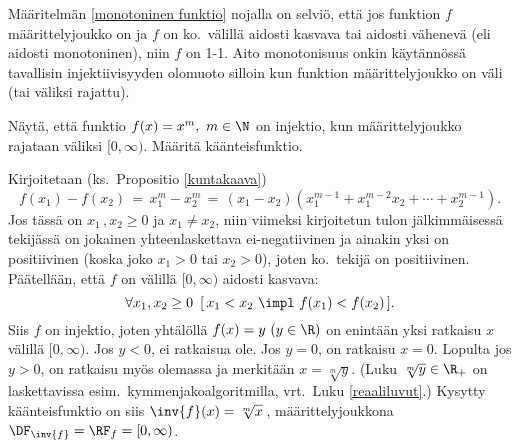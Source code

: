 Määritelmän \ref{monotoninen funktio} nojalla on selviö, että jos funktion $f$ 
määrittelyjoukko on  ja $f$ on ko.\ välillä aidosti kasvava tai aidosti vähenevä
(eli aidosti monotoninen), niin $f$ on 1-1. Aito monotonisuus onkin käytännössä tavallisin
injektiivisyyden olomuoto silloin kun funktion määrittelyjoukko on väli (tai väliksi rajattu).
\begin{Exa} \label{x^m:n käänteisfunktio} Näytä, että funktio $f(x)=x^m,\ m\in\N$ on injektio,
kun määrittelyjoukko rajataan väliksi $[0,\infty)$. Määritä käänteisfunktio.
\end{Exa}
\ratk Kirjoitetaan (ks.\ Propositio \ref{kuntakaava})
\[
f(x_1)-f(x_2) \,=\, x_1^m-x_2^m \,=\, (x_1-x_2)(x_1^{m-1}+x_1^{m-2}x_2+\cdots +x_2^{m-1}).
\]
Jos tässä on $x_1\,,x_2 \ge 0$ ja $x_1 \neq x_2$, niin viimeksi kirjoitetun tulon 
jälkimmäisessä tekijässä on jokainen yhteenlaskettava ei-negatiivinen ja ainakin yksi on
positiivinen (koska joko $x_1>0$ tai $x_2>0$), joten ko.\ tekijä on positiivinen. Päätellään,
että $f$ on välillä $[0,\infty)$ aidosti kasvava:
\[
\forall x_1,x_2 \ge 0\,\ [\,x_1<x_2\ \impl\ f(x_1)<f(x_2)\,].
\]
Siis $f$ on injektio, joten yhtälöllä $f(x)=y\ (y\in\R)$ on enintään yksi ratkaisu $x$
välillä $[0,\infty)$. Jos $y<0$, ei ratkaisua ole. Jos $y=0$, on ratkaisu $x=0$. Lopulta
jos $y>0$, on ratkaisu myös olemassa ja merkitään $x=\sqrt[m]{y}$. (Luku $\sqrt[m]{y}\in\R_+$
on laskettavissa esim.\ kymmenjakoalgoritmilla, vrt.\ Luku \ref{reaaliluvut}.) Kysytty
käänteisfunktio on siis $\inv{f}(x)=\sqrt[m]{x}\,$, määrittelyjoukkona
$\DF_{\inv{f}}=\RF_f=[0,\infty)$. \loppu
\jatko {}
